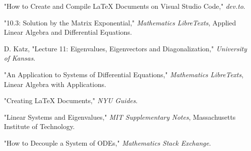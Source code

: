 \documentclass[12pt]{article}
\begin{document}
\begin{thebibliography}{99}

"How to Create and Compile LaTeX Documents on Visual Studio Code," \emph{dev.to}.

"10.3: Solution by the Matrix Exponential," \emph{Mathematics LibreTexts}, Applied Linear Algebra and Differential Equations.

D. Katz, "Lecture 11: Eigenvalues, Eigenvectors and Diagonalization," \emph{University of Kansas}.

"An Application to Systems of Differential Equations," \emph{Mathematics LibreTexts}, Linear Algebra with Applications.

"Creating LaTeX Documents," \emph{NYU Guides}.

"Linear Systems and Eigenvalues," \emph{MIT Supplementary Notes}, Massachusetts Institute of Technology.

"How to Decouple a System of ODEs," \emph{Mathematics Stack Exchange}.

\end{thebibliography}
\end{document}
